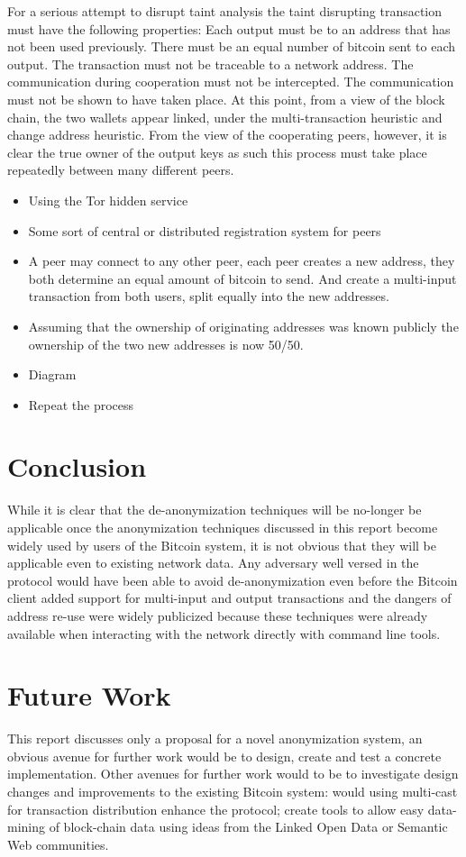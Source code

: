 For a serious attempt to disrupt taint analysis the taint disrupting transaction must have the following properties:  Each output must be to an address that has not been used previously. There must be an equal number of bitcoin sent to each output. The transaction must not be traceable to a network address.  The communication during cooperation must not be intercepted. The communication must not be shown to have taken place.  At this point, from a view of the block chain, the two wallets appear linked, under the multi-transaction heuristic and change address heuristic. From the view of the cooperating peers, however, it is clear the true owner of the output keys as such this process must take place repeatedly between many different peers.

\begin{itemize} \item Using the Tor hidden service \item Some sort of central or
        distributed registration system for peers \item A peer may connect to
            any other peer, each peer creates a new address, they both determine
            an equal amount of bitcoin to send. And create a multi-input
            transaction from both users, split equally into the new addresses.
\item Assuming that the ownership of originating addresses was known publicly
the ownership of the two new addresses is now 50/50.  \item Diagram \item Repeat
the process \end{itemize}


\section{Conclusion}
While it is clear that the de-anonymization techniques will be no-longer be applicable once the anonymization techniques discussed in this report become widely used by users of the Bitcoin system, it is not obvious that they will be applicable even to existing network data. Any adversary well versed in the protocol would have been able to avoid de-anonymization even before the Bitcoin client\cite{bitcoin-qt} added support for multi-input and output transactions and the dangers of address re-use were widely publicized because these techniques were already available when interacting with the network directly with command line tools.


\section{Future Work}
This report discusses only a proposal for a novel anonymization system, an obvious avenue for further work would be to design, create and test a concrete implementation. Other avenues for further work would to be to investigate design changes and improvements to the existing Bitcoin system: would using multi-cast for transaction distribution enhance the protocol; create tools to allow easy data-mining of block-chain data using ideas from the Linked Open Data or Semantic Web communities.

